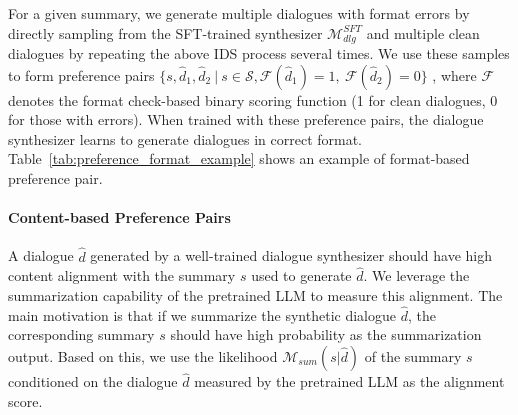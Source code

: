 For a given summary, we generate multiple dialogues with format errors by directly sampling from the SFT-trained synthesizer $\mathcal{M}_{dlg}^{SFT}$ and multiple clean dialogues by repeating the above IDS process several times. We use these samples to form preference pairs
$\{s, \hat{d}_1, \hat{d}_2\ |\ s \in \mathcal{S},  
 \mathcal{F}(\hat{d}_1) = 1,\   \mathcal{F}(\hat{d}_2) = 0\}$
, where $\mathcal{F}$ denotes the format check-based binary scoring function (1 for clean dialogues, 0 for those with errors).
When trained with these preference pairs, the dialogue synthesizer learns to generate dialogues in correct format. Table~\ref{tab:preference_format_example} shows an example of format-based preference pair.%


\paragraph{Content-based Preference Pairs}
A dialogue $\hat{d}$ generated by a well-trained dialogue synthesizer should have high content alignment with the summary $s$ used to generate $\hat{d}$. We leverage the summarization capability of the pretrained LLM to measure this alignment. The main motivation is that if we summarize the synthetic dialogue $\hat{d}$, the corresponding summary $s$ should have high probability as the summarization output. Based on this, we use the likelihood $\mathcal{M}_{sum}(s|\hat{d})$ of the summary $s$ conditioned on the dialogue $\hat{d}$ measured by the pretrained LLM as the alignment score.

